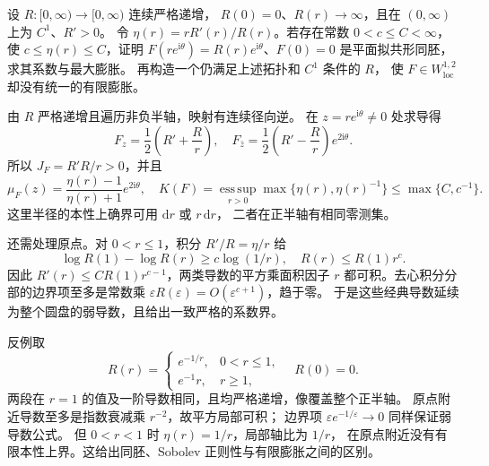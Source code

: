 \begin{exercise}\label{b3:ex:B-3}
设 \(R:[0,\infty)\rightarrow[0,\infty)\) 连续严格递增，
\(R(0)=0\)、\(R(r)\to\infty\)，且在 \((0,\infty)\) 上为 \(C^1\)、\(R'>0\)。
令 \(\eta(r)=rR'(r)/R(r)\)。若存在常数 \(0<c\le C<\infty\)，使
\(c\le\eta(r)\le C\)，证明
\(F(re^{\mathrm i\theta})=R(r)e^{\mathrm i\theta}\)、\(F(0)=0\)
是平面拟共形同胚，求其系数与最大膨胀。
再构造一个仍满足上述拓扑和 \(C^1\) 条件的 \(R\)，
使 \(F\in W^{1,2}_{\mathrm{loc}}\) 却没有统一的有限膨胀。
\end{exercise}
\begin{solution}
由 \(R\) 严格递增且遍历非负半轴，映射有连续径向逆。
在 \(z=re^{\mathrm i\theta}\ne0\) 处求导得
\[
 F_z=\frac12\left(R'+\frac Rr\right),\quad
 F_{\bar z}=\frac12\left(R'-\frac Rr\right)e^{2\mathrm i\theta}.
\]
所以 \(J_F=R'R/r>0\)，并且
\[
 \mu_F(z)=\frac{\eta(r)-1}{\eta(r)+1}e^{2\mathrm i\theta},\quad
 K(F)=\operatorname*{ess\,sup}_{r>0}
             \max\{\eta(r),\eta(r)^{-1}\}
 \le\max\{C,c^{-1}\}.
\]
这里半径的本性上确界可用 \(\mathrm dr\) 或 \(r\,\mathrm dr\)，
二者在正半轴有相同零测集。

还需处理原点。对 \(0<r\le1\)，积分 \(R'/R=\eta/r\) 给
\[
 \log R(1)-\log R(r)\ge c\log(1/r),\quad R(r)\le R(1)r^c.
\]
因此 \(R'(r)\le C R(1)r^{c-1}\)，两类导数的平方乘面积因子 \(r\)
都可积。去心积分分部的边界项至多是常数乘
\(\varepsilon R(\varepsilon)=O(\varepsilon^{c+1})\)，趋于零。
于是这些经典导数延续为整个圆盘的弱导数，且给出一致严格的系数界。

反例取
\[
 R(r)=
 \begin{cases}
 e^{-1/r},&0<r\le1,\\
 e^{-1}r,&r\ge1,
 \end{cases}
 \quad R(0)=0.
\]
两段在 \(r=1\) 的值及一阶导数相同，且均严格递增，像覆盖整个正半轴。
原点附近导数至多是指数衰减乘 \(r^{-2}\)，故平方局部可积；
边界项 \(\varepsilon e^{-1/\varepsilon}\to0\) 同样保证弱导数公式。
但 \(0<r<1\) 时 \(\eta(r)=1/r\)，局部轴比为 \(1/r\)，
在原点附近没有有限本性上界。这给出同胚、Sobolev 正则性与有限膨胀之间的区别。
\end{solution}

